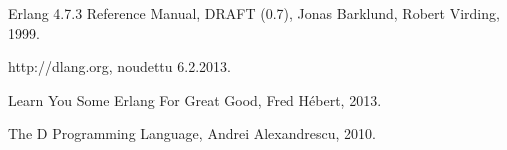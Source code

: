\documentclass[11pt,oneside,a4paper]{article}
\begin{document}
% 
% 



\begin{thebibliography}{99}

 Erlang 4.7.3 Reference Manual, DRAFT (0.7), Jonas
Barklund, Robert Virding, 1999. 

 http://dlang.org, noudettu 6.2.2013.

 Learn You Some Erlang For Great Good, Fred Hébert, 2013.

 The D Programming Language, Andrei Alexandrescu, 2010.

\end{thebibliography}
\end{document}
